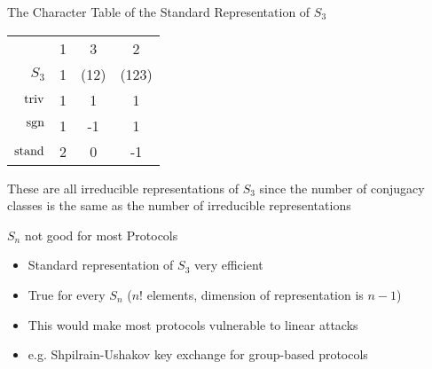 \begin{frame}{The Character Table of the Standard Representation of $S_3$}
    \large
    \begin{center}
        \begin{tabular}{r | c  c  c}
                        & 1 & 3     & 2     \\
            $S_3$       & 1 & (12)  & (123) \\ \hline \pause
            $\operatorname{triv}$     & 1 & 1     & 1     \\ \pause
            $\operatorname{sgn}$      & 1 & -1    & 1     \\ \pause
            $\operatorname{stand}$    & 2 & 0     & -1
        \end{tabular}
    \end{center}
    
    \pause
    \vspace{2em}
    These are all irreducible representations of $S_3$ since the number of conjugacy classes is the same as the number of irreducible representations

\end{frame}

\begin{frame}{$S_n$ not good for most Protocols}
    \large
    \begin{itemize}
        \item Standard representation of $S_3$ very efficient \pause
        \item True for every $S_n$ ($n!$ elements, dimension of representation is $n - 1$) \pause
        \item This would make most protocols vulnerable to linear attacks
        \item e.g. Shpilrain-Ushakov key exchange for group-based protocols
    \end{itemize}

    \vspace{1em}
    {\hspace*{\fill} \cite{khovanov2022monoidal}}
\end{frame}

